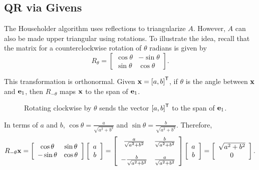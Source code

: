 \subsection*{QR via Givens} %

The Householder algorithm uses reflections to triangularize $A$.
However, $A$ can also be made upper triangular using rotations.
To illustrate the idea, recall that the matrix for a counterclockwise rotation of $\theta$ radians is given by
\[
R_\theta =
\left[\begin{array}{cc}
\cos\theta & -\sin\theta \\
\sin\theta &  \cos\theta
\end{array}\right].
\]

This transformation is orthonormal.
Given $\mathbf{x} = \left[a, b\right]^{\mathsf T}$, if $\theta$ is the angle between $\mathbf{x}$ and $\mathbf{e}_1$, then $R_{-\theta}$ maps $\mathbf{x}$ to the span of $\mathbf{e}_1$.

\begin{figure}[H]
\centering
{}
\caption{Rotating clockwise by $\theta$ sends the vector $\left[a,b\right]^{\mathsf T}$ to the span of $\mathbf{e}_1$.}
\label{fig:Givens-rotation}
\end{figure}

In terms of $a$ and $b$, $\cos \theta =  \frac{a}{\sqrt{a^2+b^2}}$ and $\sin\theta = \frac{b}{\sqrt{a^2+b^2}}$.
Therefore,
\[
R_{-\theta}\mathbf{x}
=
\left[\begin{array}{cc}
\cos\theta  & \sin\theta \\
-\sin\theta & \cos\theta \\
\end{array}\right]
\left[\begin{array}{c} a \\ b \end{array}\right]
=
\left[\begin{array}{cc}
 \frac{a}{\sqrt{a^2+b^2}} & \frac{b}{\sqrt{a^2+b^2}} \\ \\
-\frac{b}{\sqrt{a^2+b^2}} & \frac{a}{\sqrt{a^2+b^2}} \\
\end{array}\right]
\left[\begin{array}{c} a \\ b \end{array}\right]
=
\left[\begin{array}{c} \sqrt{a^2+b^2} \\ 0 \end{array}\right].
\]

